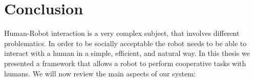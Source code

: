 
\chapter{Conclusion} %

\label{chapter-conclusion} %


Human-Robot interaction is a very complex subject, that involves different problematics. In order to be socially acceptable the robot needs to be able to interact with a human in a simple, efficient, and natural way. In this thesis we presented a framework that allows a robot to perform cooperative tasks with humans. We will now review the main aspects of our system:


